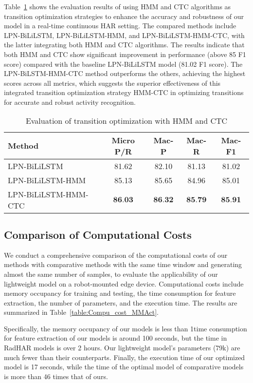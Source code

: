 Table~\ref{table:eval_trans_opt} shows the evaluation results of using HMM and CTC algorithms as transition optimization strategies to enhance the accuracy and robustness of our model in a real-time continuous HAR setting.
The compared methods include LPN-BiLiLSTM, LPN-BiLiLSTM-HMM, and LPN-BiLiLSTM-HMM-CTC, with the latter integrating both HMM and CTC algorithms. 
The results indicate that both HMM and CTC show significant improvement in performance (above 85 F1 score) compared with the baseline LPN-BiLiLSTM model (81.02 F1 score). 
The LPN-BiLSTM-HMM-CTC method outperforms the others, achieving the highest scores across all metrics, which suggests the superior effectiveness of this integrated transition optimization strategy HMM-CTC in optimizing transitions for accurate and robust activity recognition. 
\begin{table}[h]
\centering
\caption{Evaluation of transition optimization with HMM and CTC}
\label{table:eval_trans_opt}
{\begin{tabular}[l]{@{}lcccc}
\toprule
  Method &Micro P/R&Mac-P&Mac-R&Mac-F1\\
\midrule
  LPN-BiLiLSTM & 81.62 & 82.10 & 81.13 & 81.02 \\
  LPN-BiLiLSTM-HMM & 85.13 & 85.65 & 84.96 & 85.01 \\
  LPN-BiLiLSTM-HMM-CTC & $\textbf{86.03}$ & $\textbf{86.32}$ & $\textbf{85.79}$ & $\textbf{85.91}$ \\

\bottomrule
\end{tabular}}
\end{table}



\subsection{Comparison of Computational Costs}
We conduct a comprehensive comparison of the computational costs of our methods with comparative methods with the same time window and generating almost the same number of samples, to evaluate the applicability of our lightweight model on a robot-mounted edge device. 
Computational costs include memory occupancy for training and testing, the time consumption for feature extraction, the number of parameters, and the execution time. 
The results are summarized in Table~\ref{table:Compu_cost_MMAct}. 

Specifically, the memory occupancy of our models is less than 1\The time consumption for feature extraction of our models is around 100 seconds, but the time in RadHAR models is over 2 hours. 
Our lightweight model's parameters (79k) are much fewer than their counterparts. 
Finally, the execution time of our optimized model is 17 seconds, while the time of the optimal model of comparative models is more than 46 times that of ours.

